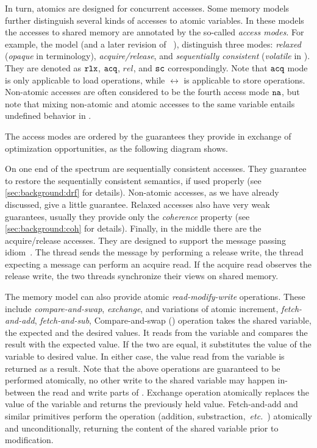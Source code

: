 In turn, atomics are designed for concurrent accesses. 
Some memory models further distinguish 
several kinds of accesses to atomic variables.
In these models the accesses to shared memory are annotated by the 
so-called \emph{access modes}.
For example, the \CPP model (and a later revision of 
\Java~\cite{Bender-Palsberg:OOPSLA19}), distinguish 
three modes: \emph{relaxed} (\emph{opaque} in \Java terminology), 
\emph{acquire/release}, and \emph{sequentially consistent}
(\emph{volatile} in \Java).
They are denoted as $\mathtt{rlx}$, ${\mathtt{acq}}$, $rel$, and ${\mathtt{sc}}$ correspondingly.
Note that ${\mathtt{acq}}$ mode is only applicable to load operations,
while $\rel$ is applicable to store operations.
Non-atomic accesses are often considered to be the fourth access mode $\mathtt{na}$, 
but note that mixing non-atomic and atomic accesses to the same variable 
entails undefined behavior in \CPP.

The access modes are ordered by the guarantees they provide
in exchange of optimization opportunities, as the following 
diagram shows.




On one end of the spectrum are sequentially consistent accesses. 
They guarantee to restore the sequentially consistent semantics, 
if used properly (see \cref{sec:background:drf} for details).
Non-atomic accesses, as we have already discussed, give a little guarantee. 
Relaxed accesses also have very weak guarantees, 
usually they provide only the \emph{coherence} property
(see \cref{sec:background:coh} for details).
Finally, in the middle there are the acquire/release accesses. 
They are designed to support the message passing idiom~\cite{Lahav-al:POPL16}.
The thread sends the message by performing a release write, 
the thread expecting a message can perform an acquire read. 
If the acquire read observes the release write, the two 
threads synchronize their views on shared memory. 

The memory model can also provide atomic \emph{read-modify-write} operations.
These include \emph{compare-and-swap}, \emph{exchange}, and variations of atomic increment,
\eg \emph{fetch-and-add}, \emph{fetch-and-sub}, \etc 
Compare-and-swap (\CAS) operation takes the shared variable, the expected 
and the desired values. It reads from the variable
and compares the result with the expected value. If the two are equal,
it substitutes the value of the variable to desired value. 
In either case, the value read from the variable is returned as a result. 
Note that the above operations are guaranteed to be performed atomically, 
no other write to the shared variable may happen in-between 
the read and write parts of \CAS.
Exchange operation atomically replaces the value 
of the variable and returns the previously held value.
Fetch-and-add and similar primitives perform 
the operation (addition, substraction,~\emph{etc.}~)
atomically and unconditionally, returning 
the content of the shared variable prior to modification.  

